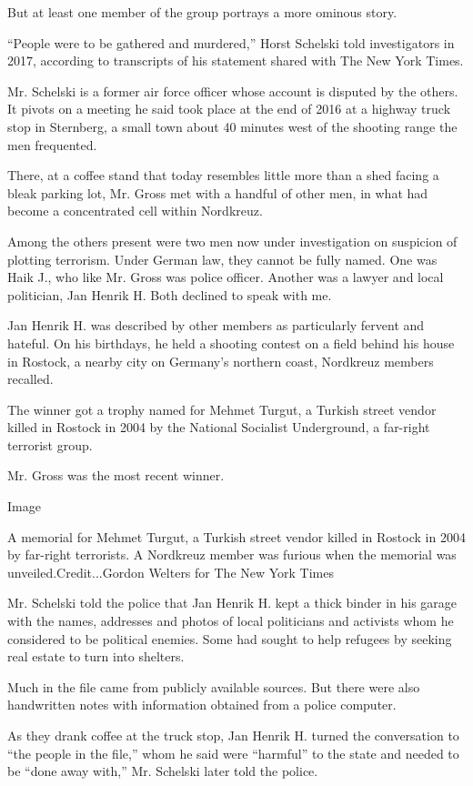 But at least one member of the group portrays a more ominous story.

``People were to be gathered and murdered,'' Horst Schelski told
investigators in 2017, according to transcripts of his statement shared
with The New York Times.

Mr. Schelski is a former air force officer whose account is disputed by
the others. It pivots on a meeting he said took place at the end of 2016
at a highway truck stop in Sternberg, a small town about 40 minutes west
of the shooting range the men frequented.

There, at a coffee stand that today resembles little more than a shed
facing a bleak parking lot, Mr. Gross met with a handful of other men,
in what had become a concentrated cell within Nordkreuz.

Among the others present were two men now under investigation on
suspicion of plotting terrorism. Under German law, they cannot be fully
named. One was Haik J., who like Mr. Gross was police officer. Another
was a lawyer and local politician, Jan Henrik H. Both declined to speak
with me.

Jan Henrik H. was described by other members as particularly fervent and
hateful. On his birthdays, he held a shooting contest on a field behind
his house in Rostock, a nearby city on Germany's northern coast,
Nordkreuz members recalled.

The winner got a trophy named for Mehmet Turgut, a Turkish street vendor
killed in Rostock in 2004 by the National Socialist Underground, a
far-right terrorist group.

Mr. Gross was the most recent winner.

Image

A memorial for Mehmet Turgut, a Turkish street vendor killed in Rostock
in 2004 by far-right terrorists. A Nordkreuz member was furious when the
memorial was unveiled.Credit...Gordon Welters for The New York Times

Mr. Schelski told the police that Jan Henrik H. kept a thick binder in
his garage with the names, addresses and photos of local politicians and
activists whom he considered to be political enemies. Some had sought to
help refugees by seeking real estate to turn into shelters.

Much in the file came from publicly available sources. But there were
also handwritten notes with information obtained from a police computer.

As they drank coffee at the truck stop, Jan Henrik H. turned the
conversation to ``the people in the file,'' whom he said were
``harmful'' to the state and needed to be ``done away with,'' Mr.
Schelski later told the police.

